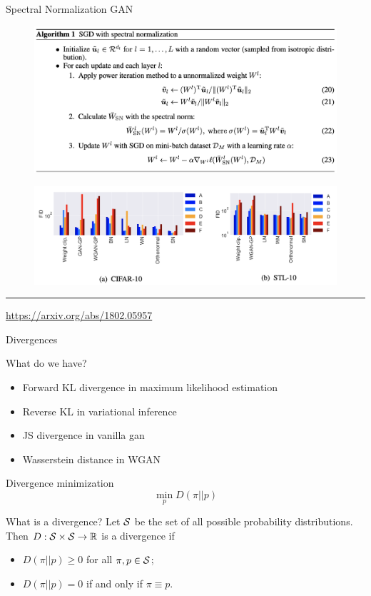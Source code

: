 \begin{frame}{Spectral Normalization GAN}
	\begin{figure}
		\centering
		\includegraphics[width=0.85\linewidth]{figs/sngan_pseudocode}
	\end{figure}
	\begin{figure}
		\centering
		\includegraphics[width=0.85\linewidth]{figs/sngan_fids}
	\end{figure}
	\vfill
	\hrule\medskip 
	{\scriptsize \href{https://arxiv.org/abs/1802.05957}{https://arxiv.org/abs/1802.05957}}
\end{frame}
\begin{frame}{Divergences}
	\begin{block}{What do we have?}
		\begin{itemize}
			\item Forward KL divergence in maximum likelihood estimation
			\item Reverse KL in variational inference
			\item JS divergence in  vanilla gan
			\item Wasserstein distance in WGAN
		\end{itemize}
	\end{block}
	\begin{block}{Divergence minimization}
		\vspace{-0.3cm}
		\[
			\min_p D(\pi || p)
		\]
		\vspace{-0.5cm}
	\end{block}
	\begin{block}{What is a divergence?}
		Let $\mathcal{S}$ be the set of all possible probability distributions. Then $D: \mathcal{S} \times \mathcal{S} \rightarrow \mathbb{R}$ is a divergence if 
		\begin{itemize}
			\item $D(\pi || p) \geq 0$ for all $\pi, p \in \mathcal{S}$;
			\item $D(\pi || p) = 0$ if and only if $\pi \equiv p$.
		\end{itemize}
	\end{block}
\end{frame}

